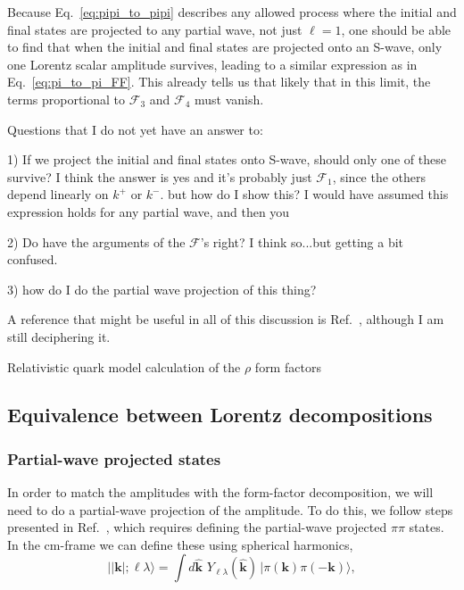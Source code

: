 Because Eq.~\ref{eq:pipi_to_pipi} describes any allowed process where the initial and final states are projected to any partial wave, not just $\ell=1$, one should be able to find that when the initial and final states are projected onto an S-wave, only one Lorentz scalar amplitude survives, leading to a similar expression as in Eq.~\ref{eq:pi_to_pi_FF}.  This already tells us that likely that in this limit, the terms proportional to $\mathcal{F}_{3}$ and $\mathcal{F}_{4}$ must vanish.




{\raul 
Questions that I do not yet have an answer to:

	1) If we project the initial and final states onto S-wave, should only one of these survive? I think the answer is yes and it's probably just $\mathcal{F}_1$, since the others depend linearly on $k^+$ or $k^-$. but how do I show this? I would have assumed this expression holds for any partial wave, and then you 
	
	2) Do have the arguments of the $\mathcal{F}$'s right? I think so...but getting a bit confused. 
	
	3) how do I do the partial wave projection of this thing? 
}

{\raul A reference that might be useful in all of this discussion is Ref.~\cite{Krutov:2004vc}, although I am still deciphering it.}

{\raul Relativistic quark model calculation of the $\rho$ form factors ~\cite{Krutov:2004qx}}


 \subsection{Equivalence between Lorentz decompositions \label{sec:equivalence}}
 
 \subsubsection{Partial-wave projected states}
In order to match the amplitudes with the form-factor decomposition, we will need to do a partial-wave projection of the amplitude. To do this, we follow steps presented in Ref.~\cite{Briceno:2016kkp}, which requires defining the partial-wave projected $\pi\pi$ states. In the cm-frame we can define these using spherical harmonics,
\begin{equation}
\big| |\textbf{k}|; \ell \lambda \big\rangle = \int \! d\hat{\mathbf{k}} \, \,{Y_{\ell \lambda}(\hat{\mathbf{k}})}\, \big| \pi(\textbf{k}) \pi(-\textbf{k})\big\rangle,
\end{equation}

